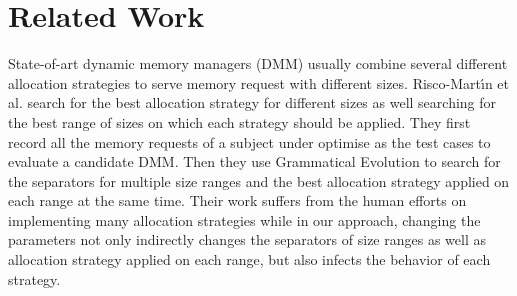 \section{Related Work}

State-of-art dynamic memory managers (DMM) usually combine several different allocation strategies to serve memory request with different sizes. Risco-Mart\'{\i}n et al. \cite{RiscoMartín2014109, Colmenar:2011:MOD:2001576.2001820} search for the best allocation strategy for different sizes as well searching for the best range of sizes on which each strategy should be applied. They first record all the memory requests of a subject under optimise as the test cases to evaluate a candidate DMM. Then they use Grammatical Evolution to search for the separators for multiple size ranges and the best allocation strategy applied on each range at the same time. Their work suffers from the human efforts on implementing many allocation strategies while in our approach, changing the parameters not only indirectly changes the separators of size ranges as well as allocation strategy applied on each range, but also infects the behavior of each strategy.



